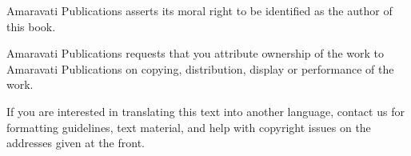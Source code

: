 {Amaravati Publications asserts its moral right to be identified as the
author of this book.

Amaravati Publications requests that you attribute ownership of the work
to Amaravati Publications on copying, distribution, display or
performance of the work.

If you are interested in translating this text into another language,
contact us for formatting guidelines, text material, and help with
copyright issues on the addresses given at the front.

}
